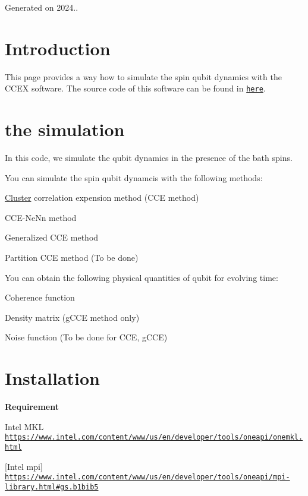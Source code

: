 Generated on 2024..\hypertarget{index_Introduction}{}\section{Introduction}\label{index_Introduction}
This page provides a way how to simulate the spin qubit dynamics with the C\-C\-E\-X software. The source code of this software can be found in \href{https://github.com/HuijinPark/CCEX}{\tt here}.\hypertarget{index_About}{}\section{the simulation}\label{index_About}
In this code, we simulate the qubit dynamics in the presence of the bath spins.

You can simulate the spin qubit dynamcis with the following methods\-:
\begin{DoxyItemize}
\item \hyperlink{structCluster}{Cluster} correlation expension method (C\-C\-E method)
\item C\-C\-E-\/\-Ne\-Nn method
\item Generalized C\-C\-E method
\item Partition C\-C\-E method (To be done)
\end{DoxyItemize}

You can obtain the following physical quantities of qubit for evolving time\-:
\begin{DoxyItemize}
\item Coherence function
\item Density matrix (g\-C\-C\-E method only)
\item Noise function (To be done for C\-C\-E, g\-C\-C\-E)
\end{DoxyItemize}\hypertarget{index_Installation}{}\section{Installation}\label{index_Installation}



{\bfseries Requirement} {\bfseries } 
\begin{DoxyItemize}
\item Intel M\-K\-L \href{https://www.intel.com/content/www/us/en/developer/tools/oneapi/onemkl.html}{\tt https\-://www.\-intel.\-com/content/www/us/en/developer/tools/oneapi/onemkl.\-html}
\item \mbox{[}Intel mpi\mbox{]} \href{https://www.intel.com/content/www/us/en/developer/tools/oneapi/mpi-library.html#gs.b1bib5}{\tt https\-://www.\-intel.\-com/content/www/us/en/developer/tools/oneapi/mpi-\/library.\-html\#gs.\-b1bib5}
\end{DoxyItemize}

